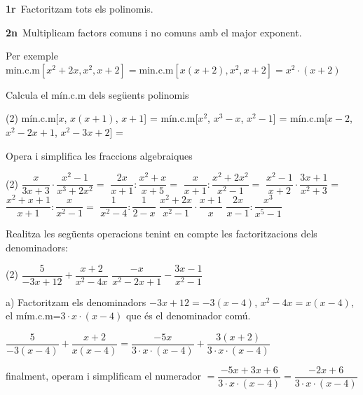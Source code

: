 	\begin{theorybox}
		\textbf{1r}\, Factoritzam tots els polinomis. 
		
		\textbf{2n}\, Multiplicam factors comuns i no comuns amb el major exponent.
		
		Per exemple $\text{min.c.m}\left[x^2+2x, x^2, x+2\right]=\text{min.c.m}\left[x(x+2), x^2, x+2\right]=x^2\cdot(x+2)$
	\end{theorybox}
\begin{mylist}	
	\exer Calcula el mín.c.m dels següents polinomis
	\begin{tasks}(2)
		\task mín.c.m[$x$, $x(x+1)$, $x+1$] =
		\task mín.c.m[$x^2$, $x^3-x$, $x^2-1$] =
		\task* mín.c.m[$x-2$, $x^2-2x+1$, $x^2-3x+2$] =
	\end{tasks}
\answers{[$x(x+1)$, $x^2(x+1)(x-1)$, $(x-1)^2 (x-2)$]}
	

	\exer[1] Opera i simplifica les fraccions algebraiques
	\begin{tasks}(2)
		\task $\dfrac{x}{3x+3} \cdot \dfrac{x^{2} -1}{x^{3} +2x^{2} } =$  
		\task $\dfrac{2x}{x+1} :\dfrac{x^{2} +x}{x+5} =$      
		\task $\dfrac{x}{x+1} :\dfrac{x^{2} +2x^{2} }{x^{2} -1} =$
		\task $\dfrac{x^{2} -1}{x+2} \cdot \dfrac{3x+1}{x^{2} +3} =$      
		\task $\dfrac{x^{2} +x+1}{x+1} :\dfrac{x}{x^{2} -1} =$    
		\task $\dfrac{1}{x^{2} -4} :\dfrac{1}{2-x} $
		\task  $\dfrac{x^{2} +2x}{x^{2} -1} \cdot \dfrac{x+1}{x} $  
		\task $\dfrac{2x}{x-1} :\dfrac{x^{3} }{x^{5} -1} $
	\end{tasks}
	
	
		\exer  Realitza les següents operacions tenint en compte les factoritzacions dels denominadors:
		\begin{tasks}(2)
	\task $\dfrac{5}{-3x+12} +\dfrac{x+2}{x^{2} -4x} $  
	\task $\dfrac{-x}{x^{2} -2x+1} -\dfrac{3x-1}{x^{2} -1} $
\end{tasks}


\end{mylist}
\begin{example}
	a) Factoritzam els denominadors $-3 x+12 = -3(x-4)$, $x^2-4x=x(x-4)$, el mím.c.m=$3\cdot x\cdot (x-4)$ que és el denominador comú.
	
	$\dfrac{5}{-3(x-4)} +\dfrac{x+2}{x(x-4)} = \dfrac{-5x}{3\cdot x\cdot (x-4)}+\dfrac{3(x+2)}{3\cdot x\cdot (x-4)}  $  
	
	finalment, operam i simplificam el numerador
	$= \dfrac{-5x+3 x+6}{3\cdot x\cdot (x-4)} = \dfrac{-2 x+6}{3\cdot x\cdot (x-4)} $  
	
\end{example}

